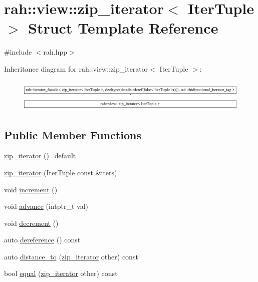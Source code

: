 \hypertarget{structrah_1_1view_1_1zip__iterator}{}\section{rah\+::view\+::zip\+\_\+iterator$<$ Iter\+Tuple $>$ Struct Template Reference}
\label{structrah_1_1view_1_1zip__iterator}


{\ttfamily \#include $<$rah.\+hpp$>$}

Inheritance diagram for rah\+::view\+::zip\+\_\+iterator$<$ Iter\+Tuple $>$\+:\begin{figure}[H]
\begin{center}
\leavevmode
\includegraphics[height=1.562064cm]{structrah_1_1view_1_1zip__iterator}
\end{center}
\end{figure}
\subsection*{Public Member Functions}
\begin{DoxyCompactItemize}
\item 
\mbox{\hyperlink{structrah_1_1view_1_1zip__iterator_a8ba7af8259dc507b57d1e3371c7f40a2}{zip\+\_\+iterator}} ()=default
\item 
\mbox{\hyperlink{structrah_1_1view_1_1zip__iterator_a2f6b7c790bcb819a68e4828f6bd6ef79}{zip\+\_\+iterator}} (Iter\+Tuple const \&iters)
\item 
void \mbox{\hyperlink{structrah_1_1view_1_1zip__iterator_a156b181d725c31af3c34180806d6428e}{increment}} ()
\item 
void \mbox{\hyperlink{structrah_1_1view_1_1zip__iterator_abc9b6f7ff787d1a08c4a327d738a1809}{advance}} (intptr\+\_\+t val)
\item 
void \mbox{\hyperlink{structrah_1_1view_1_1zip__iterator_a5618c02a5596c1306d1abc0b1413f086}{decrement}} ()
\item 
auto \mbox{\hyperlink{structrah_1_1view_1_1zip__iterator_a775ecbdf57e02dd926e5b83f0a3bd8c1}{dereference}} () const
\item 
auto \mbox{\hyperlink{structrah_1_1view_1_1zip__iterator_a01c298bede994df318d47205c50cc461}{distance\+\_\+to}} (\mbox{\hyperlink{structrah_1_1view_1_1zip__iterator}{zip\+\_\+iterator}} other) const
\item 
bool \mbox{\hyperlink{structrah_1_1view_1_1zip__iterator_ab8712d7266cdc63143e61841fa371179}{equal}} (\mbox{\hyperlink{structrah_1_1view_1_1zip__iterator}{zip\+\_\+iterator}} other) const
\end{DoxyCompactItemize}

